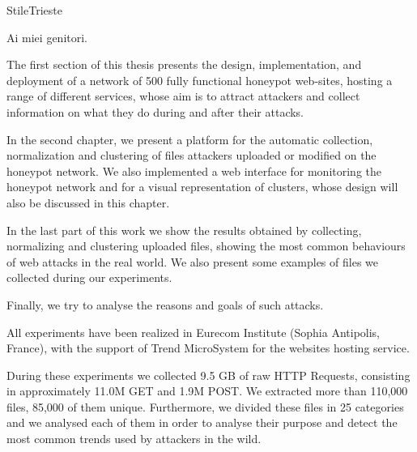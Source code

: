 \documentclass[pdfa%
,cucitura%
]{toptesi}
\begin{document}

\expandafter\ifx\csname StileTrieste\endcsname\relax
    \frontespizio
\else
    \paginavuota
    \begin{dedica}
        Ai miei genitori.
    \end{dedica}
    \tomo
\fi


\sommario

The first section of this thesis presents the design, implementation, and deployment of a network of 500 fully functional honeypot web-sites, hosting a range of different services, whose aim is to attract attackers and collect information on what they do during and after their attacks.

In the second chapter, we present a platform for the automatic collection, normalization and clustering of files attackers uploaded or modified on the honeypot network. We also implemented a web interface for monitoring the honeypot network and for a visual representation of clusters, whose design will also be discussed in this chapter.

In the last part of this work we show the results obtained by collecting, normalizing and clustering uploaded files, showing the most common behaviours of web attacks in the real world. We also present some examples of files we collected during our experiments.

Finally, we try to analyse the reasons and goals of such attacks.

All experiments have been realized in Eurecom Institute (Sophia Antipolis, France), with the support of Trend MicroSystem for the websites hosting service.

During these experiments we collected 9.5 GB of raw HTTP Requests, consisting in approximately 11.0M GET and 1.9M POST. We extracted more than 110,000 files, 85,000 of them unique. Furthermore, we divided these files in 25 categories and we analysed each of them in order to analyse their purpose and detect the most common trends used by attackers in the wild.


\end{document}
